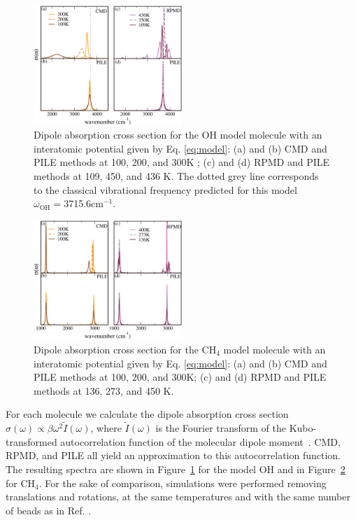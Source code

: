\documentclass[aps,prb,superscriptaddress,amsmath,amssymb,showpacs,twocolumn]{revtex4}
\begin{document}
\begin{figure}[htbp]
\centering
\includegraphics[width=0.5\textwidth]{figures/comparison_oh_factors.pdf}
\caption{Dipole absorption cross section for the OH model molecule with an interatomic potential given by Eq. \ref{eq:model}: (a) and (b) CMD and PILE methods at 100, 200, and 300K ; (c)  and (d) RPMD and PILE methods at 109, 450, and 436 K. The dotted grey line corresponds to the classical vibrational frequency predicted for this model $\omega_\text{OH}=$3715.6cm$^{-1}$.}
\label{fig:oh-rpmd-cmd-pile}
\end{figure}

\begin{figure}[htbp]
\centering
\includegraphics[width=0.5\textwidth]{figures/comparison_ch4_factors.pdf}
\caption{Dipole absorption cross section for the CH$_4$ model molecule with an interatomic potential given by Eq. \ref{eq:model}: (a) and (b) CMD and PILE methods at 100, 200, and 300K; (c) and (d) RPMD and PILE methods at 136, 273, and 450 K.}
\label{fig:ch4-rpmd-cmd-pile}
\end{figure}

For each molecule we calculate the dipole absorption cross section $\sigma(\omega)\propto \beta\omega^2\tilde{I}(\omega)$, 
where $\tilde{I}(\omega)$ is the Fourier transform of the Kubo-transformed autocorrelation function of the molecular dipole 
moment~\cite{habe+08jcp}. CMD, RPMD, and PILE all yield an approximation to this autocorrelation function. 
The resulting spectra are shown in Figure~\ref{fig:oh-rpmd-cmd-pile} for the model OH 
and in Figure~\ref{fig:ch4-rpmd-cmd-pile} for CH$_4$. 
For the sake of comparison, simulations were performed removing translations and 
rotations, at the same temperatures and with the same number of beads as in Ref. \cite{witt+09jcp}.
\end{document}
